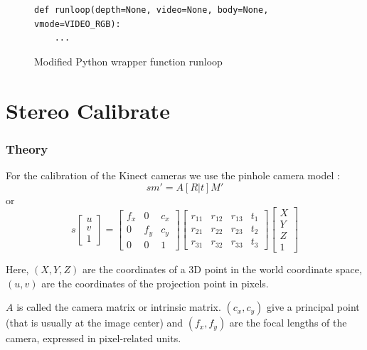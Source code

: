 \begin{figure}[H]
\begin{lstlisting}
def runloop(depth=None, video=None, body=None, vmode=VIDEO_RGB):
    ...
\end{lstlisting}
\caption{Modified Python wrapper function runloop}
\label{code:mod_runloop}
\end{figure}


\section{Stereo Calibrate}
\label{sec:stereo_calibrate}

\subsubsection{Theory}
For the calibration of the Kinect cameras we use the pinhole camera model \cite{OPENCV}:
\[
s m' = A \left[R|t\right]M'
\]
or
\[
s 
\left[ \begin{array}{c} 
u\\
v\\
1  
\end{array} \right]
=
\left[ \begin{array}{ccc} 
f_x & 0 & c_x\\
0 & f_y & c_y\\
0 & 0 & 1  
\end{array} \right]
\left[ \begin{array}{cccc}
r_{11} & r_{12} & r_{13} & t_1\\
r_{21} & r_{22} & r_{23} & t_2\\
r_{31} & r_{32} & r_{33} & t_3
\end{array} \right]
\left[ \begin{array}{c} 
X\\
Y\\
Z\\
1  
\end{array} \right]
\]

Here, $\left( X, Y, Z \right)$ are the coordinates of a 3D point in the world coordinate space, $\left( u, v \right)$ are the coordinates of the projection point in pixels.

$A$ is called the camera matrix or intrinsic matrix. $\left( c_x, c_y \right)$ give a principal point (that is usually at the image center) and $\left( f_x, f_y \right)$ are the focal lengths of the camera, expressed in pixel-related units.

